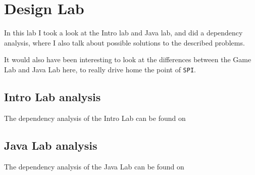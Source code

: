 \section{Design Lab} \label{design-lab}

In this lab I took a look at the Intro lab and Java lab, and did a dependency
analysis, where I also talk about possible solutions to the described problems.

It would also have been interesting to look at the differences between the Game
Lab and Java Lab here, to really drive home the point of \texttt{SPI}.

\subsection{Intro Lab analysis}
The dependency analysis of the Intro Lab can be found on

\subsection{Java Lab analysis}
The dependency analysis of the Java Lab can be found on
